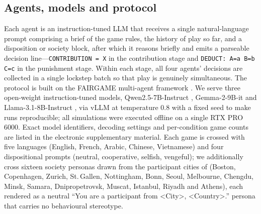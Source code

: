 \subsection{Agents, models and protocol}
Each agent is an instruction-tuned LLM that receives a single natural-language prompt comprising a brief of the game rules, the history of play so far, and a disposition or society block, after which it reasons briefly and emits a parseable decision line---\texttt{CONTRIBUTION = X} in the contribution stage and \texttt{DEDUCT: A=a B=b C=c} in the punishment stage. Within each stage, all four agents' decisions are collected in a single lockstep batch so that play is genuinely simultaneous. The protocol is built on the FAIRGAME multi-agent framework \parencite{fairgame2025}. We serve three open-weight instruction-tuned models, Qwen2.5-7B-Instruct \parencite{qwen2025}, Gemma-2-9B-it \parencite{gemma2024} and Llama-3.1-8B-Instruct \parencite{llama2024}, via vLLM at temperature 0.8 with a fixed seed to make runs reproducible; all simulations were executed offline on a single RTX PRO 6000. Exact model identifiers, decoding settings and per-condition game counts are listed in the electronic supplementary material. Each game is crossed with five languages (English, French, Arabic, Chinese, Vietnamese) and four dispositional prompts (neutral, cooperative, selfish, vengeful); we additionally cross sixteen society personas drawn from the participant cities of \textcite{herrmann2008antisocial} (Boston, Copenhagen, Zurich, St.\,Gallen, Nottingham, Bonn, Seoul, Melbourne, Chengdu, Minsk, Samara, Dnipropetrovsk, Muscat, Istanbul, Riyadh and Athens), each rendered as a neutral ``You are a participant from <City>, <Country>.'' persona that carries no behavioural stereotype.

